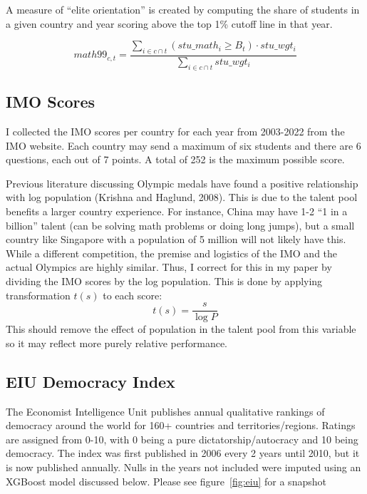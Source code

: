 \documentclass[11pt]{article}
\begin{document}
A measure of ``elite orientation'' is created by computing the share of students in a given country and year scoring above the top 1\% cutoff line in that year.

\begin{equation}
    math99_{c, t} = \frac{\sum_{i \in c \cap t} (stu\_math_i \geq B_t) \cdot stu\_wgt_i}{\sum_{i \in c \cap t} stu\_wgt_i}
\end{equation}

\subsection{IMO Scores}
I collected the IMO scores per country for each year from 2003-2022 from the IMO website. Each country may send a maximum of six students and there are 6 questions, each out of 7 points. A total of 252 is the maximum possible score.

Previous literature discussing Olympic medals have found a positive relationship with log population (Krishna and Haglund, 2008). This is due to the talent pool benefits a larger country experience. For instance, China may have 1-2 “1 in a billion” talent (can be solving math problems or doing long jumps), but a small country like Singapore with a population of 5 million will not likely have this. While a different competition, the premise and logistics of the IMO and the actual Olympics are highly similar. Thus, I correct for this in my paper by dividing the IMO scores by the log population. This is done by applying transformation $t(s)$ to each score:
\begin{equation}
    t(s) = \frac{s}{\log P}
\end{equation}
This should remove the effect of population in the talent pool from this variable so it may reflect more purely relative performance.

\subsection{EIU Democracy Index}
The Economist Intelligence Unit publishes annual qualitative rankings of democracy around the world for 160+ countries and territories/regions. Ratings are assigned from 0-10, with 0 being a pure dictatorship/autocracy and 10 being democracy. The index was first published in 2006 every 2 years until 2010, but it is now published annually. Nulls in the years not included were imputed using an XGBoost model discussed below. Please see figure~\ref{fig:eiu} for a snapshot
\end{document}
